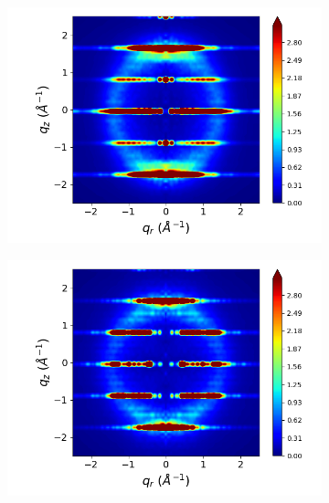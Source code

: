 \documentclass[journal=jpcbfk,manuscript=article]{achemso}
\begin{document}
\begin{figure}[!htb]
\begin{subfigure}{0.3\linewidth}
  	\label{fig:rotated_monomers_rzplot_restrained}
  \end{subfigure}
  \begin{subfigure}{0.3\linewidth}
  	\centering
  	\includegraphics[width=\textwidth]{staggered_rzplot_restrained.png}
  	\label{fig:staggered_rzplot_restrained}
  \end{subfigure}
  \begin{subfigure}{0.3\linewidth}
  	\centering
  	\includegraphics[width=\textwidth]{solvated_pore_rzplot_restrained.png}
  	\label{fig:solvated_pore_rzplot_restrained}
  \end{subfigure}

\end{figure}
\end{document}

